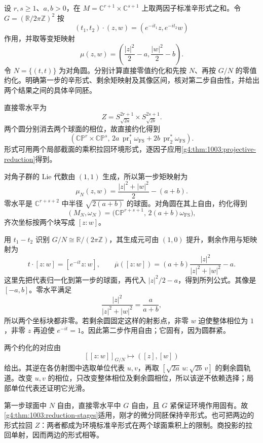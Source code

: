 \begin{exercise}\label{g4:ex:1003:diagonal-stages}
	设 \(r,s\ge1\)、\(a,b>0\)，在
	\(M=\mathbb C^{r+1}\times\mathbb C^{s+1}\) 上取两因子标准辛形式之和。令 \(G=(\mathbb R/2\pi\mathbb Z)^2\) 按
	\[
		(t_1,t_2)\cdot(z,w)=(e^{-it_1}z,e^{-it_2}w)
	\]
	作用，并取等变矩映射
	\[
		\mu(z,w)=\left(\frac{|z|^2}{2}-a,\frac{|w|^2}{2}-b\right).
	\]
	令 \(N=\{(t,t)\}\) 为对角圆。分别计算直接零值约化和先按 \(N\)、再按 \(G/N\) 的零值约化。明确第一步的辛形式、剩余矩映射及其像区间，核对第二步自由性，并给出两个结果之间的具体辛同胚。
\end{exercise}
\begin{solution}
	直接零水平为
	\[
		Z=S^{2r+1}_{\sqrt{2a}}\times S^{2s+1}_{\sqrt{2b}}.
	\]
	两个圆分别消去两个球面的相位，故直接约化得到
	\[
		\left(\mathbb{CP}^r\times\mathbb{CP}^s,\,
		2a\,\operatorname{pr}_1^*\omega_{\mathrm{FS}}
		+2b\,\operatorname{pr}_2^*\omega_{\mathrm{FS}}\right).
	\]
	形式可用两个局部截面的乘积拉回环境形式，逐因子应用\cref{g4:thm:1003:projective-reduction}得到。

	对角子群的 Lie 代数由 \((1,1)\) 生成，所以第一步矩映射为
	\[
		\mu_N(z,w)=\frac{|z|^2+|w|^2}{2}-(a+b).
	\]
	零水平是 \(\mathbb C^{r+s+2}\) 中半径 \(\sqrt{2(a+b)}\) 的球面。对角圆在其上自由，约化得到
	\[
		(M_N,\omega_N)=
		\bigl(\mathbb{CP}^{r+s+1},\,2(a+b)\omega_{\mathrm{FS}}\bigr),
	\]
	齐次坐标按两个块写成 \([z:w]\)。

	用 \(t_1-t_2\) 识别 \(G/N\cong\mathbb R/(2\pi\mathbb Z)\)，其生成元可由 \((1,0)\) 提升，剩余作用与矩映射为
	\[
		t\cdot[z:w]=[e^{-it}z:w],\qquad
		\overline\mu([z:w])
		=(a+b)\frac{|z|^2}{|z|^2+|w|^2}-a.
	\]
	这里先把代表归一化到第一步的球面，再代入 \(|z|^2/2-a\)，得到所列公式。其像是 \([-a,b]\)。零水平满足
	\[
		\frac{|z|^2}{|z|^2+|w|^2}=\frac{a}{a+b},
	\]
	所以两个坐标块都非零。若剩余圆固定这样的射影点，非零 \(w\) 迫使整体相位为 \(1\)，非零 \(z\) 再迫使 \(e^{-it}=1\)。因此第二步作用自由；它固有，因为圆群紧。

	两个约化的对应由
	\[
		[[z:w]]_{G/N}\longmapsto([z],[w])
	\]
	给出。其逆在各仿射图中选取单位代表 \(u,v\)，再取
	\([\sqrt{2a}\,u:\sqrt{2b}\,v]\) 的剩余圆轨道。改变 \(u,v\) 的相位，只改变整体相位及剩余圆相位，所以该逆不依赖选择；局部单位代表还证明它光滑。

	第一步球面中 \(N\) 自由，直接零水平中 \(G\) 自由，且 \(G\) 紧保证环境作用固有。故\cref{g4:thm:1003:reduction-stages}适用，刚才的微分同胚保持辛形式。也可把两边的形式拉回 \(Z\)：两者都成为环境标准辛形式在两个球面乘积上的限制。商投影的拉回单射，因而两边的形式相等。
\end{solution}

